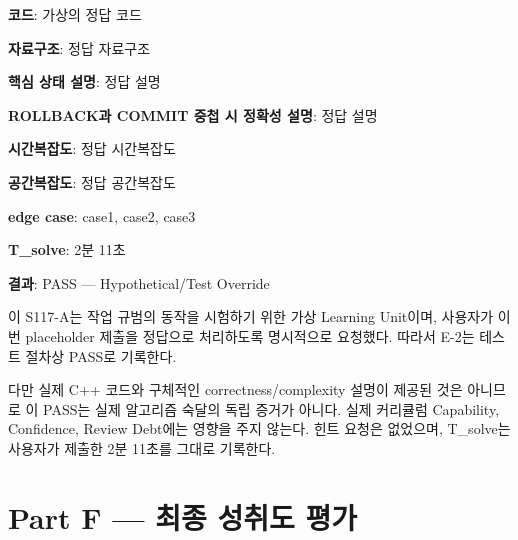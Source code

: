 \begin{answerbox}
\textbf{코드}: 가상의 정답 코드

\textbf{자료구조}: 정답 자료구조

\textbf{핵심 상태 설명}: 정답 설명

\textbf{ROLLBACK과 COMMIT 중첩 시 정확성 설명}: 정답 설명

\textbf{시간복잡도}: 정답 시간복잡도

\textbf{공간복잡도}: 정답 공간복잡도

\textbf{edge case}: case1, case2, case3

\textbf{T\_solve}: 2분 11초
\end{answerbox}

\begin{notebox}
\textbf{결과}: PASS --- Hypothetical/Test Override

이 S117-A는 작업 규범의 동작을 시험하기 위한 가상 Learning Unit이며, 사용자가 이번 placeholder 제출을 정답으로 처리하도록 명시적으로 요청했다. 따라서 E-2는 테스트 절차상 PASS로 기록한다.

다만 실제 C++ 코드와 구체적인 correctness/complexity 설명이 제공된 것은 아니므로 이 PASS는 실제 알고리즘 숙달의 독립 증거가 아니다. 실제 커리큘럼 Capability, Confidence, Review Debt에는 영향을 주지 않는다. 힌트 요청은 없었으며, T\_solve는 사용자가 제출한 2분 11초를 그대로 기록한다.
\end{notebox}


\section{Part F --- 최종 성취도 평가}

